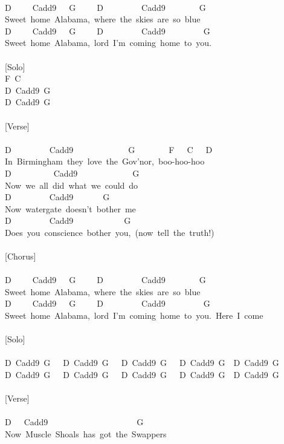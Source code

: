 \documentclass[]{book}
\begin{document}
~\\
D~~~~~Cadd9~~~G~~~~~D~~~~~~~~~Cadd9~~~~~~~~G~~~~~~~~~\\
Sweet~home~Alabama,~where~the~skies~are~so~blue\\
D~~~~~Cadd9~~~G~~~~~D~~~~~~~~~Cadd9~~~~~~~~~G~~~~~~\\
Sweet~home~Alabama,~lord~I'm~coming~home~to~you.\\
~\\
{[}Solo{]}\\
F~C\\
D~Cadd9~G~\\
D~Cadd9~G~\\
~\\
{[}Verse{]}\\
~\\
D~~~~~~~~~Cadd9~~~~~~~~~~~~~G~~~~~~~~F~~~C~~~D\\
In~Birmingham~they~love~the~Gov'nor,~boo-hoo-hoo\\
D~~~~~~~~~~Cadd9~~~~~~~~~~~~~G\\
Now~we~all~did~what~we~could~do\\
D~~~~~~~~~Cadd9~~~~~~~G\\
Now~watergate~doesn't~bother~me\\
D~~~~~~~~~Cadd9~~~~~~~~~~~~G\\
Does~you~conscience~bother~you,~(now~tell~the~truth!)\\
~\\
{[}Chorus{]}\\
~\\
D~~~~~Cadd9~~~G~~~~~D~~~~~~~~~Cadd9~~~~~~~~G~~~~~~~~~\\
Sweet~home~Alabama,~where~the~skies~are~so~blue\\
D~~~~~Cadd9~~~G~~~~~D~~~~~~~~~Cadd9~~~~~~~~~G~~~~~~\\
Sweet~home~Alabama,~lord~I'm~coming~home~to~you.~Here~I~come\\
~\\
{[}Solo{]}\\
~\\
D~Cadd9~G~~~D~Cadd9~G~~~D~Cadd9~G~~~D~Cadd9~G~~D~Cadd9~G~~~\\
D~Cadd9~G~~~D~Cadd9~G~~~D~Cadd9~G~~~D~Cadd9~G~~D~Cadd9~G~\\
~\\
{[}Verse{]}\\
~\\
D~~~Cadd9~~~~~~~~~~~~~~~~~~~~~G\\
Now~Muscle~Shoals~has~got~the~Swappers\\
\end{document}
